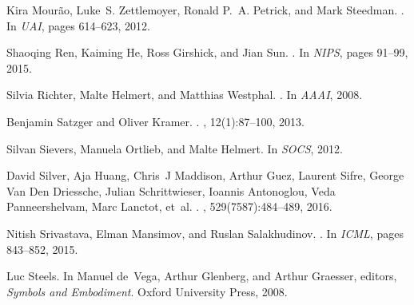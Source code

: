 \documentclass[11pt]{article}
\begin{document}
\begin{thebibliography}{}
Kira Mour{\~a}o, Luke~S. Zettlemoyer, Ronald P.~A. Petrick, and Mark Steedman.
.
\newblock In {\em {UAI}}, pages 614--623, 2012.

Shaoqing Ren, Kaiming He, Ross Girshick, and Jian Sun.
.
\newblock In {\em {NIPS}}, pages 91--99, 2015.

Silvia Richter, Malte Helmert, and Matthias Westphal.
.
\newblock In {\em {AAAI}}, 2008.

Benjamin Satzger and Oliver Kramer.
.
, 12(1):87--100, 2013.

Silvan Sievers, Manuela Ortlieb, and Malte Helmert.
\newblock In {\em {SOCS}}, 2012.

David Silver, Aja Huang, Chris~J Maddison, Arthur Guez, Laurent Sifre, George
  {Van Den Driessche}, Julian Schrittwieser, Ioannis Antonoglou, Veda
  Panneershelvam, Marc Lanctot, et~al.
.
, 529(7587):484--489, 2016.

Nitish Srivastava, Elman Mansimov, and Ruslan Salakhudinov.
.
\newblock In {\em {ICML}}, pages 843--852, 2015.

Luc Steels.
\newblock In Manuel de~Vega, Arthur Glenberg, and Arthur Graesser, editors,
  {\em {Symbols and Embodiment}}. Oxford University Press, 2008.


\end{thebibliography}
\end{document}
